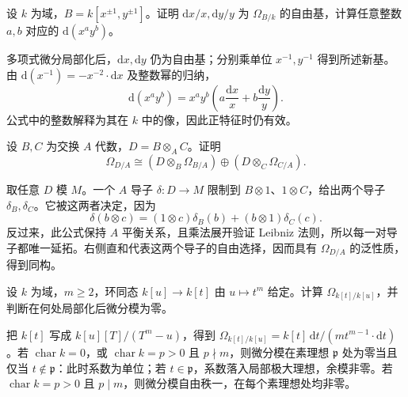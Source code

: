 \begin{exercise}\label{b3:ex:14-laurent-differentials}
	设 \(k\) 为域，\(B=k[x^{\pm1},y^{\pm1}]\)。证明 \(\mathrm{d}x/x,\mathrm{d}y/y\) 为 \(\Omega_{B/k}\) 的自由基，计算任意整数 \(a,b\) 对应的 \(\mathrm{d}(x^ay^b)\)。
\end{exercise}
\begin{solution}
	多项式微分局部化后，\(\mathrm{d}x,\mathrm{d}y\) 仍为自由基；分别乘单位 \(x^{-1},y^{-1}\) 得到所述新基。由 \(\mathrm{d}(x^{-1})=-x^{-2}\cdot\mathrm{d}x\) 及整数幂的归纳，
	\[
		\mathrm{d}(x^ay^b)=x^ay^b\left(a\dfrac{\mathrm{d}x}{x}+b\dfrac{\mathrm{d}y}{y}\right).
	\]
	公式中的整数解释为其在 \(k\) 中的像，因此正特征时仍有效。
\end{solution}

\begin{exercise}\label{b3:ex:14-tensor-product-differentials}
	设 \(B,C\) 为交换 \(A\) 代数，\(D=B\otimes_A C\)。证明
	\[
		\Omega_{D/A}\cong (D\otimes_B\Omega_{B/A})\oplus(D\otimes_C\Omega_{C/A}).
	\]
\end{exercise}
\begin{solution}
	取任意 \(D\) 模 \(M\)。一个 \(A\) 导子 \(\delta:D\to M\) 限制到 \(B\otimes1\)、\(1\otimes C\)，给出两个导子 \(\delta_B,\delta_C\)。它被这两者决定，因为
	\[
		\delta(b\otimes c)=(1\otimes c)\delta_B(b)+(b\otimes1)\delta_C(c).
	\]
	反过来，此公式保持 \(A\) 平衡关系，且乘法展开验证 Leibniz 法则，所以每一对导子都唯一延拓。右侧直和代表这两个导子的自由选择，因而具有 \(\Omega_{D/A}\) 的泛性质，得到同构。
\end{solution}

\begin{exercise}\label{b3:ex:14-power-map-differentials}
	设 \(k\) 为域，\(m\ge2\)，环同态 \(k[u]\to k[t]\) 由 \(u\mapsto t^m\) 给定。计算 \(\Omega_{k[t]/k[u]}\)，并判断在何处局部化后微分模为零。
\end{exercise}
\begin{solution}
	把 \(k[t]\) 写成 \(k[u][T]/(T^m-u)\)，得到 \(\Omega_{k[t]/k[u]}=k[t]\,\mathrm{d}t/(m t^{m-1}\cdot\mathrm{d}t)\)。若 \(\operatorname{char}k=0\)，或 \(\operatorname{char}k=p>0\) 且 \(p\nmid m\)，则微分模在素理想 \(\mathfrak p\) 处为零当且仅当 \(t\notin\mathfrak p\)：此时系数为单位；若 \(t\in\mathfrak p\)，系数落入局部极大理想，余模非零。若 \(\operatorname{char}k=p>0\) 且 \(p\mid m\)，则微分模自由秩一，在每个素理想处均非零。
\end{solution}

